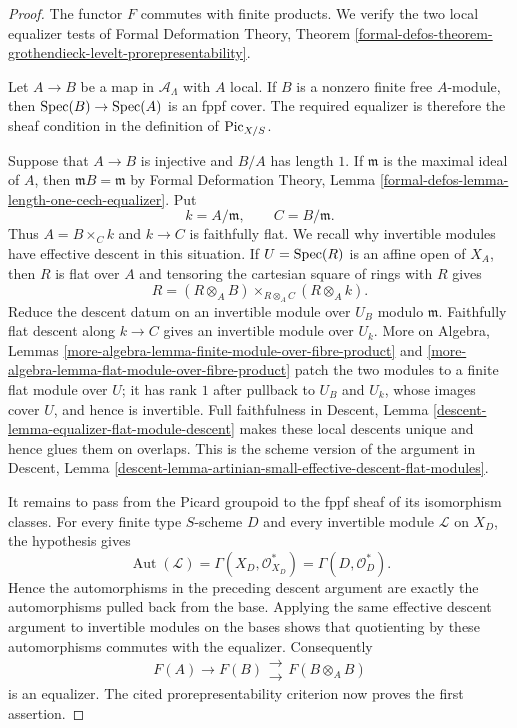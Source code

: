 \begin{proof}
The functor $F$ commutes with finite products. We verify the two local
equalizer tests of Formal Deformation Theory, Theorem
\ref{formal-defos-theorem-grothendieck-levelt-prorepresentability}.

Let $A \to B$ be a map in $\mathcal{A}_\Lambda$ with $A$ local. If $B$ is a
nonzero finite free $A$-module, then $\mathop{\mathrm{Spec}}(B) \to \mathop{\mathrm{Spec}}(A)$ is an fppf
cover. The required equalizer is therefore the sheaf condition in the
definition of $\mathrm{Pic}_{X/S}$.

Suppose that $A \to B$ is injective and $B/A$ has length $1$. If $\mathfrak m$
is the maximal ideal of $A$, then
$\mathfrak mB = \mathfrak m$ by Formal Deformation Theory, Lemma
\ref{formal-defos-lemma-length-one-cech-equalizer}. Put
$$
k = A/\mathfrak m, \qquad C = B/\mathfrak m.
$$
Thus $A = B \times_C k$ and $k \to C$ is faithfully flat. We recall why
invertible modules have effective descent in this situation. If
$U = \mathop{\mathrm{Spec}}(R)$ is an affine open of $X_A$, then $R$ is flat over $A$ and
tensoring the cartesian square of rings with $R$ gives
$$
R = (R \otimes_A B) \mathbin{\times}_{R \otimes_A C} (R \otimes_A k).
$$
Reduce the descent datum on an invertible module over $U_B$ modulo
$\mathfrak m$. Faithfully flat descent along $k \to C$ gives an invertible
module over $U_k$. More on Algebra, Lemmas
\ref{more-algebra-lemma-finite-module-over-fibre-product} and
\ref{more-algebra-lemma-flat-module-over-fibre-product} patch the two
modules to a finite flat module over $U$; it has rank $1$ after pullback to
$U_B$ and $U_k$, whose images cover $U$, and hence is invertible. Full
faithfulness in Descent, Lemma
\ref{descent-lemma-equalizer-flat-module-descent} makes these local descents
unique and hence glues them on overlaps. This is the scheme version of the
argument in Descent, Lemma
\ref{descent-lemma-artinian-small-effective-descent-flat-modules}.

It remains to pass from the Picard groupoid to the fppf sheaf of its
isomorphism classes. For every finite type $S$-scheme $D$ and every invertible
module $\mathcal{L}$ on $X_D$, the hypothesis gives
$$
\operatorname{Aut}(\mathcal{L}) =
\Gamma(X_D, \mathcal{O}_{X_D}^*) = \Gamma(D, \mathcal{O}_D^*).
$$
Hence the automorphisms in the preceding descent argument are exactly the
automorphisms pulled back from the base. Applying the same effective descent
argument to invertible modules on the bases shows that quotienting by these
automorphisms commutes with the equalizer. Consequently
$$
F(A) \longrightarrow F(B)
\mathrel{\substack{\longrightarrow \\[-0.6ex] \longrightarrow}}
F(B \otimes_A B)
$$
is an equalizer. The cited prorepresentability criterion now proves the first
assertion.


\end{proof}
